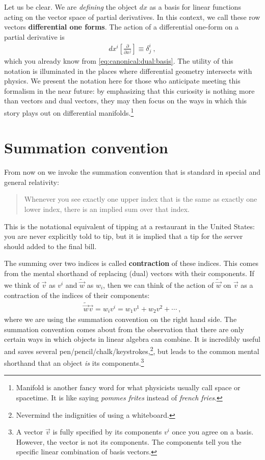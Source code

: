 \documentclass[
  11pt,
	colorful,
	raggedright,
]{tufte-style-thesis-flip}
\begin{document}
 Let us be clear. We are \emph{defining} the object $dx$ as a basis for linear functions acting on the vector space of partial derivatives. In this context, we call these row vectors \textbf{differential one forms}. The action of a differential one-form on a partial derivative is
 \begin{align}
   dx^i\left[\frac{\partial}{\partial x^j}\right] \equiv \delta^i_j \ ,
 \end{align}
 which you already know from \eqref{eq:canonical:dual:basis}. The utility of this notation is illuminated in the places where differential geometry intersects with physics. We present the notation here for those who anticipate meeting this formalism in the near future: by emphasizing that this curiosity is nothing more than vectors and dual vectors, they may then focus on the ways in which this story plays out on differential manifolds.\footnote{Manifold is another fancy word for what physicists usually call space or spacetime. It is like saying \emph{pommes frites} instead of \emph{french fries}.} 
 

\section{Summation convention}

From now on we invoke the summation convention that is standard in special and general relativity:
\begin{quote}
Whenever you see exactly one upper index that is the same as exactly one lower index, there is an implied sum over that index.
\end{quote}
This is the notational equivalent of tipping at a restaurant in the United States: you are never explicitly told to tip, but it is implied that a tip for the server should added to the final bill.

The summing over two indices is called \textbf{contraction} of these indices. This comes from the mental shorthand of replacing (dual) vectors with their components. If we think of $\vec{v}$ as $v^i$ and $\tilde{\vec{w}}$ as $w_i$, then we can think of the action of $\tilde{\vec w}$ on $\vec v$ as a contraction of the indices of their components:
\begin{align}
  \tilde{\vec w}\vec{v} = w_i v^i = w_1v^1 + w_2v^2 + \cdots \ ,
\end{align}
where we are using the summation convention on the right hand side.
%
The summation convention comes about from the observation that there are only certain ways in which objects in linear algebra can combine. It is incredibly useful and saves several pen/pencil/chalk/keystrokes,\footnote{Nevermind the indignities of using a whiteboard.}, but leads to the common mental shorthand that an object \emph{is} its components.\footnote{A vector $\vec{v}$ is fully specified by its components $v^i$ once you agree on a basis. However, the vector is not its components. The components tell you the specific linear combination of basis vectors.}
\end{document}

